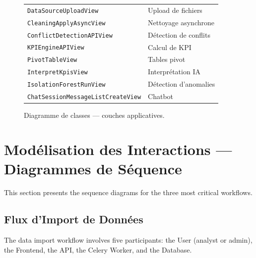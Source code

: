 \begin{figure}[h!]
{{\begin{tabular}{|l|l|}
\hline
\texttt{DataSourceUploadView} & Upload de fichiers \\
\texttt{CleaningApplyAsyncView} & Nettoyage asynchrone \\
\texttt{ConflictDetectionAPIView} & Détection de conflits \\
\texttt{KPIEngineAPIView} & Calcul de KPI \\
\texttt{PivotTableView} & Tables pivot \\
\texttt{InterpretKpisView} & Interprétation IA \\
\texttt{IsolationForestRunView} & Détection d'anomalies \\
\texttt{ChatSessionMessageListCreateView} & Chatbot \\
\hline
\end{tabular}

\vspace{0.5cm}
}}
\caption{Diagramme de classes — couches applicatives.}
\label{fig:classes}
\end{figure}


\section{Modélisation des Interactions — Diagrammes de Séquence}

\noindent
This section presents the sequence diagrams
for the three most critical workflows.

\subsection{Flux d'Import de Données}

\noindent
The data import workflow involves five participants:
the User (analyst or admin), the Frontend,
the API, the Celery Worker, and the Database.

